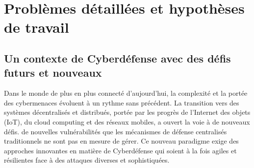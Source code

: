 \chapter{Problèmes détaillées et hypothèses de travail}\label{ch:problem}

\section{Un contexte de Cyberdéfense avec des défis futurs et nouveaux}

Dans le monde de plus en plus connecté d'aujourd'hui, la complexité et la portée des cybermenaces évoluent à un rythme sans précédent. La transition vers des systèmes décentralisés et distribués, portée par les progrès de l'Internet des objets (IoT), du cloud computing et des réseaux mobiles, a ouvert la voie à de nouveaux défis. de nouvelles vulnérabilités que les mécanismes de défense centralisés traditionnels ne sont pas en mesure de gérer\cite{sun2014data}. Ce nouveau paradigme exige des approches innovantes en matière de Cyberdéfense qui soient à la fois agiles et résilientes face à des attaques diverses et sophistiquées\cite{taddeo2019trusting}.